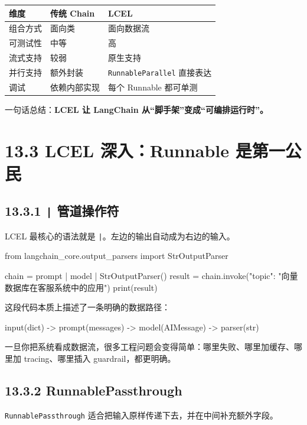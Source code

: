 \begingroup
\scriptsize
\setlength{\tabcolsep}{3pt}
\begin{longtable}{|p{}|p{}|p{}|}
\hline
维度 & 传统 Chain & LCEL \\ \hline
组合方式 & 面向类 & 面向数据流 \\ \hline
可测试性 & 中等 & 高 \\ \hline
流式支持 & 较弱 & 原生支持 \\ \hline
并行支持 & 额外封装 & \texttt{RunnableParallel} 直接表达 \\ \hline
调试 & 依赖内部实现 & 每个 Runnable 都可单测 \\ \hline
\end{longtable}
\endgroup

一句话总结：\textbf{LCEL 让 LangChain 从“脚手架”变成“可编排运行时”。}


\section{13.3 LCEL 深入：Runnable 是第一公民}

\subsection{13.3.1 \texttt{|} 管道操作符}

LCEL 最核心的语法就是 \texttt{|}。左边的输出自动成为右边的输入。


\begin{codeblock}
from langchain_core.output_parsers import StrOutputParser

chain = prompt | model | StrOutputParser()
result = chain.invoke({"topic": "向量数据库在客服系统中的应用"})
print(result)
\end{codeblock}

这段代码本质上描述了一条明确的数据路径：


\begin{codeblock}
input(dict) -> prompt(messages) -> model(AIMessage) -> parser(str)
\end{codeblock}

一旦你把系统看成数据流，很多工程问题会变得简单：哪里失败、哪里加缓存、哪里加 tracing、哪里插入 guardrail，都更明确。


\subsection{13.3.2 RunnablePassthrough}

\texttt{RunnablePassthrough} 适合把输入原样传递下去，并在中间补充额外字段。


